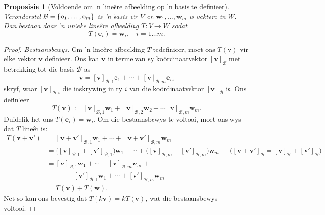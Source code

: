 \documentclass[a4paper,11pt]{book}
\newtheorem{proposition}[theorem]{Proposisie}
\theoremstyle{definition}
\newcommand{\be}{\begin{equation}}
\newcommand{\ee}{\end{equation}}
\newcommand{\ve}[1]{\mathbf{#1}}
\newcommand{\basis}[1]{{\mathcal #1}}
\newcommand{\bmark}{\raisebox{.53ex}{\rule{.2em}{.1ex}}}
\newcommand{\bopen}{{\protect\ooalign{\{\cr\hfil\bmark\hfil\cr}}}
\newcommand{\bclose}{{\protect\ooalign{\}\cr\hfil\bmark\hfil\cr}}}
\begin{document}
\begin{proposition}[Voldoende om 'n line{\^e}re afbeelding op 'n basis te
	definieer] \label{defining_linear_map_on_basis} 
	Veronderstel $\basis{B} = \bopen \ve{e}_1, \ldots, \ve{e}_m \bclose$ 
	is 'n basis vir $V$ en $\ve{w}_1, \ldots, \ve{w}_m$ is vektore in $W$.
	Dan bestaan daar 'n unieke line{\^e}re afbeelding $T : V \rightarrow W$
	sodat
	\[
		T(\ve{e}_i) = \ve{w}_i, \quad i = 1 \ldots m.
	\]
\end{proposition}


\begin{proof} \emph{Bestaansbewys}. Om 'n line{\^e}re afbeelding $T$
	tedefinieer, moet ons $T(\ve{v})$ vir elke vektor $\ve{v}$ definieer.
	Ons kan $\ve{v}$ in terme van sy ko{\"o}rdinaatvektor
	$[\ve{v}]_\basis{B}$ met betrekking tot die basis $\basis{B}$ as
	\be \label{expansion_of_v_in_coords}
		\ve{v} = [\ve{v}]_{\basis{B}, 1} \ve{e}_1 + \cdots +
		[\ve{v}]_{\basis{B}, m} \ve{e}_m
	\ee
	skryf, waar $[\ve{v}]_{\basis{B}, i}$ die inskrywing in ry $i$ van die
	ko{\"o}rdinaatvektor $[\ve{v}]_\basis{B}$ is. Ons definieer
	\be \label{formula_for_T}
		T(\ve{v}) := [\ve{v}]_{\basis{B}, 1} \ve{w}_1 +
		[\ve{v}]_{\basis{B}, 2}
		\ve{w}_2 + \cdots [\ve{v}]_{\basis{B}, m} \ve{w}_m.
	\ee
	Duidelik het ons $T(\ve{e}_i) = \ve{w}_i$. Om die bestaansbewys te
	voltooi, moet ons wys dat $T$ line{\^e}r is:
	\begin{align*}
		T(\ve{v} + \ve{v}') &= [\ve{v} + \ve{v}']_{\basis{B},1} \ve{w}_1 +
		\cdots + [\ve{v} + \ve{v}']_{\basis{B}, m} \ve{w}_m \\
		&= \big([\ve{v}]_{\basis{B}, 1} + [\ve{v}']_{\basis{B}, 1} \big)
		\ve{w}_1 + \cdots + \big([\ve{v}]_{\basis{B}, m} +
		[\ve{v}']_{\basis{B}, m}\big) \ve{w}_m && \mbox{($[\ve{v} +
		\ve{v}']_\basis{B} = [\ve{v}]_\basis{B} + [\ve{v}']_\basis{B}$)}
		\\
		&=  [\ve{v}]_{\basis{B}, 1} \ve{w}_1 + \cdots +
		[\ve{v}]_{\basis{B}, m} \ve{w}_m   + \\ & \qquad \qquad
		[\ve{v}']_{\basis{B}, 1} \ve{w}_1 + \cdots + [\ve{v}']_{\basis{B},
		m} \ve{w}_m  \\
		&= T(\ve{v}) + T(\ve{w}).
	\end{align*}
	Net so kan ons bevestig dat $T(k \ve{v}) = k T(\ve{v})$, wat die
	bestaansbewys voltooi.


\end{proof}
\end{document}
